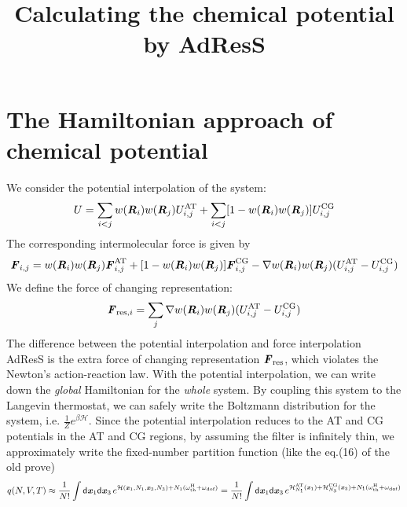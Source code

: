 \documentclass[aip,jcp,a4paper,reprint,onecolumn]{revtex4-1}
\newcommand{\vect}[1]{\textbf{\textit{#1}}}
\newcommand{\dd}[0]{\textsf{d}}
\newcommand{\AT}{{\textrm{{AT}}}}
\newcommand{\CG}{{\textrm{CG}}}
\newcommand{\thf}{{\textrm{th}}}
\newcommand{\dof}{{\textrm{dof}}}
\newcommand{\res}{{\textrm{res}}}
\newcommand{\hadress}{{\textrm{H}}}
\newcommand{\mh}{\mathcal H}
\begin{document}
\title{Calculating the chemical potential by AdResS}

\begin{abstract}
\end{abstract}

\maketitle

\section{The Hamiltonian approach of chemical potential}
We consider the potential interpolation of the
system:
\begin{align}
  U =
  \sum_{i<j} w(\vect R_i) w(\vect R_j)
  U^\AT_{i,j}
  +
  \sum_{i<j}[1- w(\vect R_i) w(\vect R_j)]
  U^\CG_{i,j}
\end{align}
The corresponding intermolecular force is given by
\begin{align}\label{eqn:interpol-f}
  \vect F_{i,j} =
  w(\vect R_i) w(\vect R_j)
  \vect F^\AT_{i,j}
  +
  [1- w(\vect R_i) w(\vect R_j)]
  \vect F_{i,j}^\CG
  -
  \nabla w(\vect R_i) w(\vect R_j)
  (U^\AT_{i,j} - U^\CG_{i,j})
\end{align}
We define the force of changing representation:
\begin{align}
  \vect F_{\res,i} = 
  \sum_j \nabla w(\vect R_i) w(\vect R_j)
  (U^\AT_{i,j} - U^\CG_{i,j})
\end{align}
The difference between the potential interpolation and force
interpolation AdResS is the extra force of
changing representation $\vect F_\res$,
which violates the Newton's
action-reaction law. With the potential interpolation, we can write down
the \emph{global} Hamiltonian for the \emph{whole} system.
By coupling this system
to the Langevin thermostat, we can safely write the Boltzmann
distribution for the system, i.e.  $\frac 1Ze^{\beta\mh}$.  Since the
potential interpolation reduces to the AT and CG potentials in the AT and
CG regions, by assuming the filter is infinitely thin, we approximately
write the fixed-number partition function (like the eq.(16) of the old prove)
\begin{align}
  q(N, V, T)
  \approx
  \frac1{N!}\int\dd\vect x_1\dd\vect x_3\,
  e^{\mh(\vect x_1, N_1, \vect x_3, N_3) +  N_1(\omega^\hadress_\thf + \omega_\dof)}
  =
  \frac1{N!}\int\dd\vect x_1\dd\vect x_3\,
  e^{\mh^\AT_{N_1}(\vect x_1) +\mh^\CG_{N_3}( \vect x_3) +
  N_1(\omega^\hadress_\thf + \omega_\dof)}
\end{align}
\end{document}
